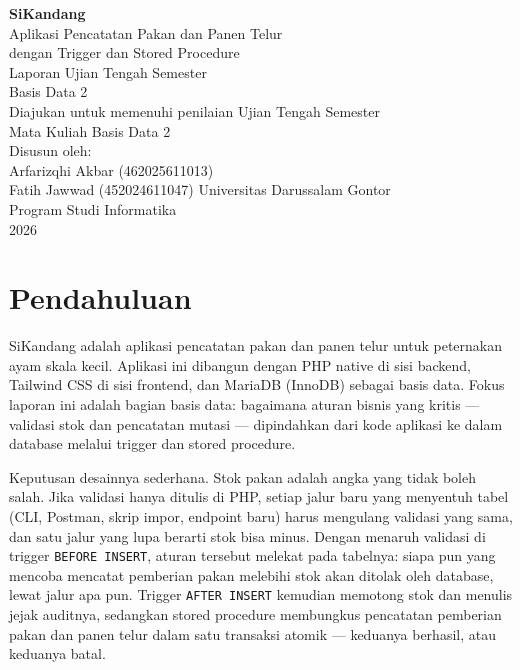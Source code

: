 \documentclass[12pt,a4paper]{article}
\begin{document}

\begin{center}
\vspace*{1.2cm}
{\Large\bfseries\color{primaryblue} SiKandang}\\[0.3em]
{\large Aplikasi Pencatatan Pakan dan Panen Telur\\dengan Trigger dan Stored Procedure}\\[1.2em]
{\large Laporan Ujian Tengah Semester}\\[0.3em]
{\large Basis Data 2}\\[1.5em]
Diajukan untuk memenuhi penilaian Ujian Tengah Semester\\[0.3em]
Mata Kuliah Basis Data 2\\[1.5em]
Disusun oleh:\\[0.5em]
{\large Arfarizqhi Akbar \quad (462025611013)}\\[0.2em]
{\large Fatih Jawwad \quad (452024611047)}
{\large Universitas Darussalam Gontor}\\[0.2em]
{\large Program Studi Informatika}\\[0.2em]
{\large 2026}
\end{center}
\thispagestyle{plain}
\clearpage

\tableofcontents
\clearpage

\section{Pendahuluan}

SiKandang adalah aplikasi pencatatan pakan dan panen telur untuk peternakan ayam skala kecil. Aplikasi ini dibangun dengan PHP native di sisi backend, Tailwind CSS di sisi frontend, dan MariaDB (InnoDB) sebagai basis data. Fokus laporan ini adalah bagian basis data: bagaimana aturan bisnis yang kritis --- validasi stok dan pencatatan mutasi --- dipindahkan dari kode aplikasi ke dalam database melalui trigger dan stored procedure.

Keputusan desainnya sederhana. Stok pakan adalah angka yang tidak boleh salah. Jika validasi hanya ditulis di PHP, setiap jalur baru yang menyentuh tabel (CLI, Postman, skrip impor, endpoint baru) harus mengulang validasi yang sama, dan satu jalur yang lupa berarti stok bisa minus. Dengan menaruh validasi di trigger \texttt{BEFORE INSERT}, aturan tersebut melekat pada tabelnya: siapa pun yang mencoba mencatat pemberian pakan melebihi stok akan ditolak oleh database, lewat jalur apa pun. Trigger \texttt{AFTER INSERT} kemudian memotong stok dan menulis jejak auditnya, sedangkan stored procedure membungkus pencatatan pemberian pakan dan panen telur dalam satu transaksi atomik --- keduanya berhasil, atau keduanya batal.
\end{document}
